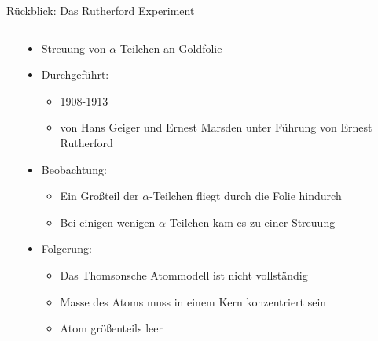 \documentclass[aspectratio=1610, 9pt]{beamer}
\begin{document}
\begin{frame}{Rückblick: Das Rutherford Experiment}
\begin{columns}
\begin{column}{0.4\textwidth}
    \end{column}
    \begin{column}{0.6\textwidth}
      \begin{itemize}
      \item{Streuung von $\alpha$-Teilchen an Goldfolie}
      \item{Durchgeführt: }
      \begin{itemize}
        \item{1908-1913}
        \item{von Hans Geiger und Ernest Marsden unter Führung von Ernest Rutherford}
      \end{itemize}
      \item{Beobachtung: }
      \begin{itemize}
        \item{Ein Großteil der $\alpha$-Teilchen fliegt durch die Folie hindurch}
        \item{Bei einigen wenigen $\alpha$-Teilchen kam es zu einer Streuung}
      \end{itemize}
      \item{Folgerung:}
      \begin{itemize}
        \item{Das Thomsonsche Atommodell ist nicht vollständig}
        \item{Masse des Atoms muss in einem Kern konzentriert sein}
        \item{Atom größenteils leer}
      \end{itemize}
      \end{itemize}
    \end{column}
  \end{columns}
\end{frame}
\end{document}
